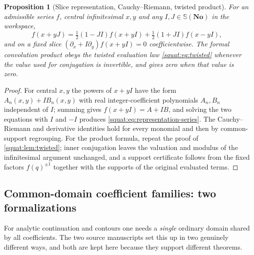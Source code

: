 \documentclass[11pt,letterpaper]{article}
\numberwithin{equation}{section}
\newtheorem{proposition}[proposition]{Proposition}
\theoremstyle{definition}
\theoremstyle{remark}
\newcommand{\No}{\mathbf{No}}
\begin{document}
\begin{proposition}[Slice representation, Cauchy--Riemann, twisted product]
\label{squat:prop:representation}
For an admissible series $f$, central infinitesimal $x,y$ and any $I,J\in\mathbb S(\No)$ in
the workspace,
\begin{equation}\label{squat:eq:representation-series}
 f(x+yJ)=\tfrac12(1-JI)f(x+yI)+\tfrac12(1+JI)f(x-yI),
\end{equation}
and on a fixed slice $(\partial_x+I\partial_y)f(x+yI)=0$ coefficientwise. The formal
convolution product obeys the twisted evaluation law \cref{squat:eq:twisted} whenever the
value used for conjugation is invertible, and gives zero when that value is zero.
\end{proposition}
\begin{proof}
For central $x,y$ the powers of $x+yI$ have the form $A_n(x,y)+IB_n(x,y)$ with real
integer-coefficient polynomials $A_n,B_n$ independent of $I$; summing gives
$f(x+yI)=A+IB$, and solving the two equations with $I$ and $-I$ produces
\cref{squat:eq:representation-series}. The Cauchy--Riemann and derivative identities hold
for every monomial and then by common-support regrouping. For the product formula, repeat
the proof of \cref{squat:lem:twisted}; inner conjugation leaves the valuation and modulus
of the infinitesimal argument unchanged, and a support certificate follows from the fixed
factors $f(q)^{\pm1}$ together with the supports of the original evaluated terms.
\end{proof}

\subsection{Common-domain coefficient families: two formalizations}\label{squat:sub:coherent}
For analytic continuation and contours one needs a \emph{single} ordinary domain shared by
all coefficients. The two source manuscripts set this up in two genuinely different ways,
and both are kept here because they support different theorems.
\end{document}
